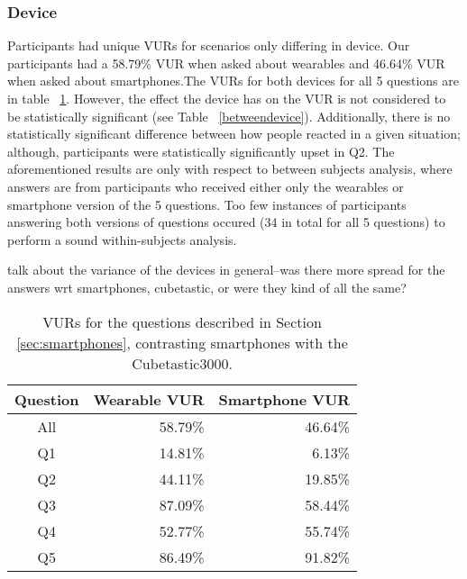\subsubsection{Device}
Participants had unique VURs for scenarios only differing in device. Our participants had a 58.79\% VUR when asked about wearables and 46.64\% VUR when asked about smartphones.The VURs for both devices for all 5 questions are in table ~\ref{deviceVUR}. However, the effect the device has on the VUR is not considered to be statistically significant (see Table ~\ref{betweendevice}). Additionally, there is no statistically significant difference between how people reacted in a given situation; although, participants were statistically significantly upset in Q2. The aforementioned results are only with respect to between subjects analysis, where answers are from participants who received either only the wearables or smartphone version of the 5 questions. Too few instances of participants answering both versions of questions occured (34 in total for all 5 questions) to perform a sound within-subjects analysis. 

{\color {red} talk about the variance of the devices in general--was there more spread for the answers wrt smartphones, cubetastic, or were they kind of all the same?}

\begin{table}[t]
\begin{center}
\begin{tabular}{| c | r | r |}
\hline
 Question &  Wearable VUR & Smartphone VUR \\
 \hline
 All & 58.79\% & 46.64\%\\
Q1 & 14.81\%  &  6.13\%\\
Q2 & 44.11\%  &  19.85\%\\
Q3 & 87.09\%  &  58.44\%\\
Q4 & 52.77\%  & 55.74\%\\
Q5 & 86.49\%  &  91.82\%\\ 
\hline
\end{tabular}
\caption{VURs for the questions described in Section \ref{sec:smartphones}, contrasting smartphones with the Cubetastic3000.}
\label{deviceVUR}
\end{center}
\end{table}

